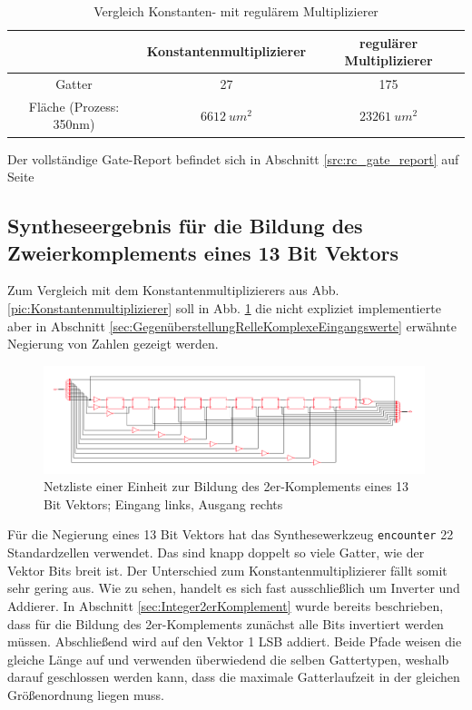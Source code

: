 \begin{table}[!ht]
 \caption{Vergleich Konstanten- mit regulärem Multiplizierer}
 \label{tab:VergleichMultiplizierer}
 \begin{tabular}{ccc}
 \hline
				& Konstantenmultiplizierer 	& regulärer Multiplizierer\\
  \hline	
  Gatter			& 27				& 175 \\
  Fläche (Prozess: 350nm)	& $\SI{6612}{um^2}$		& $\SI{23261}{um^2}$\\
  \hline
 \end{tabular}
\end{table}





Der vollständige Gate-Report befindet sich in Abschnitt \ref{src:rc_gate_report} auf Seite \pageref{src:rc_gate_report}



\subsection{Syntheseergebnis für die Bildung des Zweierkomplements eines 13 Bit Vektors}\label{sec:SyntheseergebnisBildungZweierkomplement}

Zum Vergleich mit dem Konstantenmultiplizierers aus Abb. \ref{pic:Konstantenmultiplizierer} soll in Abb. \ref{pic:13BitInverter} die nicht expliziet implementierte aber in Abschnitt
\ref{sec:GegenüberstellungRelleKomplexeEingangswerte} erwähnte Negierung von Zahlen gezeigt werden.

\begin{figure}[htpb]
\centering
\includegraphics[width=0.99\textwidth]{img/13Bit_Inverter_Netlist.png}
\caption{Netzliste einer Einheit zur Bildung des 2er-Komplements eines 13 Bit Vektors; Eingang links, Ausgang rechts}
\label{pic:13BitInverter}
\end{figure}

Für die Negierung eines 13 Bit Vektors hat das Synthesewerkzeug \texttt{encounter} 22 Standardzellen verwendet. Das sind knapp doppelt so viele Gatter, wie der Vektor 
Bits breit ist. Der Unterschied zum Konstantenmultiplizierer fällt somit sehr gering aus. 
Wie zu sehen, handelt es sich fast ausschließlich um Inverter und Addierer. In Abschnitt \ref{sec:Integer2erKomplement} wurde bereits beschrieben, dass für die Bildung des
2er-Komplements zunächst alle Bits invertiert werden müssen. Abschließend wird auf den Vektor 1 LSB addiert. 
Beide Pfade weisen die gleiche Länge auf und verwenden überwiedend die selben
Gattertypen, weshalb darauf geschlossen werden kann, dass die maximale Gatterlaufzeit in der gleichen Größenordnung liegen muss.



